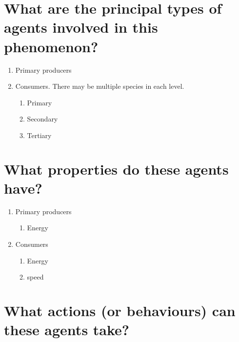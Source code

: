 \documentclass[]{article}
\begin{document}
\section{What are the principal types of agents involved in this phenomenon?}

\begin{enumerate}
	\item Primary producers
	\item Consumers. There may be multiple species in each level.
	\begin{enumerate}
		\item Primary
		\item Secondary
		\item Tertiary 
	\end{enumerate}
\end{enumerate}

\section{What properties do these agents have?}

\begin{enumerate}
	\item Primary producers
	\begin{enumerate}
		\item Energy
	\end{enumerate}
	\item Consumers
	\begin{enumerate}
		\item Energy
		\item speed
		
	\end{enumerate}
\end{enumerate}

\section{What actions (or behaviours) can these agents take?}
\end{document}
